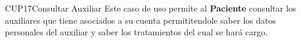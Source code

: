 \begin{UseCase}{CUP17}{Consultar Auxiliar}
    {
    	Este caso de uso permite al \textbf{Paciente} consultar los auxiliares que tiene asociados a su cuenta permititendole saber los datos personales del auxiliar y saber los tratamientos del cual se hará cargo.
    }


\end{UseCase}
